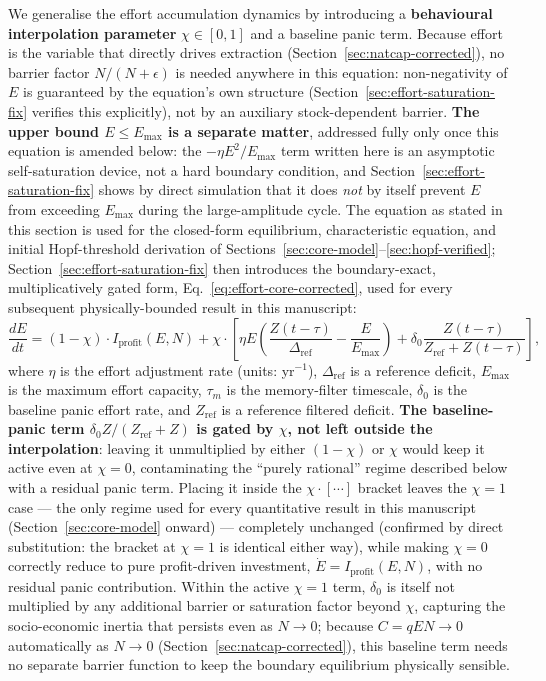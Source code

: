 \documentclass[twocolumn,10pt]{article}
\begin{document}
We generalise the effort accumulation dynamics by introducing a \textbf{behavioural interpolation parameter} \(\chi \in [0,1]\) and a baseline panic term. Because effort is the variable that directly drives extraction (Section~\ref{sec:natcap-corrected}), no barrier factor $N/(N+\epsilon)$ is needed anywhere in this equation: non-negativity of $E$ is guaranteed by the equation's own structure (Section~\ref{sec:effort-saturation-fix} verifies this explicitly), not by an auxiliary stock-dependent barrier. \textbf{The upper bound $E\le E_{\max}$ is a separate matter}, addressed fully only once this equation is amended below: the $-\eta E^2/E_{\max}$ term written here is an asymptotic self-saturation device, not a hard boundary condition, and Section~\ref{sec:effort-saturation-fix} shows by direct simulation that it does \emph{not} by itself prevent $E$ from exceeding $E_{\max}$ during the large-amplitude cycle. The equation as stated in this section is used for the closed-form equilibrium, characteristic equation, and initial Hopf-threshold derivation of Sections~\ref{sec:core-model}--\ref{sec:hopf-verified}; Section~\ref{sec:effort-saturation-fix} then introduces the boundary-exact, multiplicatively gated form, Eq.~\eqref{eq:effort-core-corrected}, used for every subsequent physically-bounded result in this manuscript:
\begin{equation}
\frac{dE}{dt} = (1-\chi) \cdot I_{\text{profit}}(E, N) + \chi \cdot \left[ \eta E \left( \frac{Z(t-\tau)}{\Delta_{\text{ref}}} - \frac{E}{E_{\max}} \right) + \delta_0 \frac{Z(t-\tau)}{Z_{\text{ref}} + Z(t-\tau)} \right],
\label{eq:effort-generalized}
\end{equation}
where \(\eta\) is the effort adjustment rate (units: yr\(^{-1}\)), \(\Delta_{\text{ref}}\) is a reference deficit, \(E_{\max}\) is the maximum effort capacity, \(\tau_m\) is the memory-filter timescale, \(\delta_0\) is the baseline panic effort rate, and \(Z_{\text{ref}}\) is a reference filtered deficit. \textbf{The baseline-panic term $\delta_0 Z/(Z_{\text{ref}}+Z)$ is gated by $\chi$, not left outside the interpolation}: leaving it unmultiplied by either $(1-\chi)$ or $\chi$ would keep it active even at $\chi=0$, contaminating the ``purely rational'' regime described below with a residual panic term. Placing it inside the $\chi\cdot[\cdots]$ bracket leaves the $\chi=1$ case --- the only regime used for every quantitative result in this manuscript (Section~\ref{sec:core-model} onward) --- completely unchanged (confirmed by direct substitution: the bracket at $\chi=1$ is identical either way), while making $\chi=0$ correctly reduce to pure profit-driven investment, $\dot E=I_{\text{profit}}(E,N)$, with no residual panic contribution. Within the active $\chi=1$ term, $\delta_0$ is itself not multiplied by any additional barrier or saturation factor beyond $\chi$, capturing the socio-economic inertia that persists even as \(N \to 0\); because $C=qEN\to0$ automatically as $N\to0$ (Section~\ref{sec:natcap-corrected}), this baseline term needs no separate barrier function to keep the boundary equilibrium physically sensible.
\end{document}
